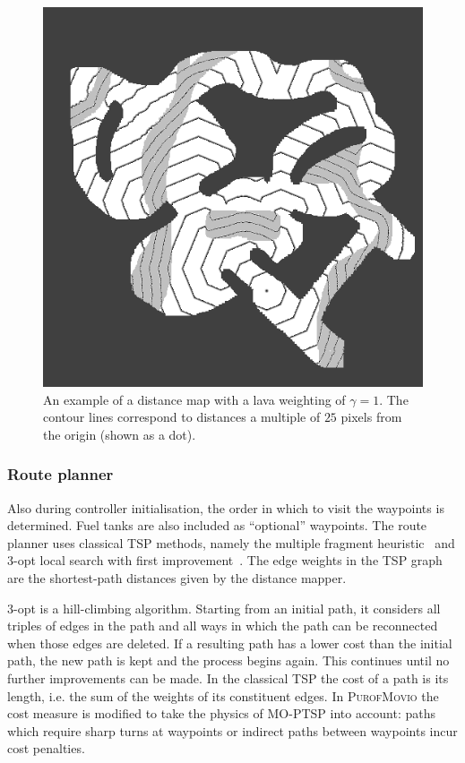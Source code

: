 \documentclass[conference]{IEEEtran}
\begin{document}
\begin{figure}%
\begin{center}
	\includegraphics[width=0.7\columnwidth]{img/distance-map-weighted.png}%
\end{center}
\caption{An example of a distance map with a lava weighting of $\gamma = 1$. The contour lines correspond to distances a multiple of $25$ pixels from the origin (shown as a dot).}%
\label{fig:distance-map-weighted}%
\end{figure}

\subsubsection{Route planner}
Also during controller initialisation, the order in which to visit the waypoints is determined.
Fuel tanks are also included as ``optional'' waypoints.
The route planner uses classical TSP methods, namely the multiple fragment heuristic~\cite{Bentley1990} and 3-opt local search with first improvement~\cite{Lin1965,Johnson1997}.
The edge weights in the TSP graph are the shortest-path distances given by the distance mapper.

3-opt is a hill-climbing algorithm.
Starting from an initial path,
it considers all triples of edges in the path
and all ways in which the path can be reconnected when those edges are deleted.
If a resulting path has a lower cost than the initial path,
the new path is kept and the process begins again.
This continues until no further improvements can be made.
In the classical TSP the cost of a path is its length, i.e. the sum of the weights of its constituent edges.
In \textsc{PurofMovio} the cost measure is modified to take the physics of MO-PTSP into account:
paths which require sharp turns at waypoints or indirect paths between waypoints incur cost penalties.
\end{document}
